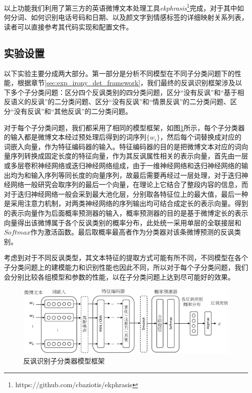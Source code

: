 以上功能我们利用了第三方的英语微博文本处理工具\textit{ekphrasis}\footnote{https://github.com/cbaziotis/ekphrasis}完成，对于其中如何分词、如何识别电话号码和日期、以及颜文字到情感标签的详细映射关系列表，读者可以直接参考其代码实现和配置文件。

\subsection{实验设置}

以下实验主要分成两大部分。第一部分是分析不同模型在不同子分类问题下的性能，根据章节\ref{sec:exp_irony_det_framework}，我们最终的反讽识别框架涉及以下多个子分类问题：区分四个反讽类别的四分类问题，区分“没有反讽”和“基于相反语义的反讽”的二分类问题、区分“没有反讽”和“情景反讽”的二分类问题、区分“没有反讽”和“其他反讽”的二分类问题。

对于每个子分类问题，我们都采用了相同的模型框架，如图\ref{fig:irony_det_cls_framework}所示，每个子分类器的输入都是微博文本经过预处理后得到的词序列$\{w_i\}$，然后每个词替换成对应的词嵌入向量，作为特征编码器的输入。特征编码器的目的是把微博文本对应的词向量序列转换成固定长度的特征向量，作为其反讽属性相关的表示向量，首先由一层或多层卷积神经网络或迭归神经网络组成，由于一维神经网络和迭归神经网络的输出均为和输入序列等同长度的向量序列，故最后需要再经过一层处理，对于迭归神经网络一般研究会取序列的最后一个向量，在理论上它结合了整段内容的信息，而对于迭归神经网络一般会采到最大池化层，分别取各特征位上的最大值，最后一种是采用注意力机制，对两类神经网络的序列输出均可结合成定长的表示向量。得到的表示向量作为后面概率预测器的输入，概率预测器的目的是基于微博定长的表示向量得出该微博属于各个反讽类别的概率分布，此处统一采用单层的全联接层和$Softmax$作为激活函数。最后取概率最高者作为分类器对该条微博预测的反讽类别。

考虑到对于不同反讽类型，其文本特征的提取方式可能有所不同，不同模型在各个子分类问题上的建模能力和识别性能也因此不同，所以对于每个子分类问题，我们会分别比较各组模型和参数的性能，以在子分类问题上达到尽可能好的效果。

\begin{figure}[H]
  \centering
  \includegraphics[width=\textwidth]{img/irony_det_cls_framework.pdf}
  \caption{反讽识别子分类器模型框架}
  \label{fig:irony_det_cls_framework}
\end{figure}

